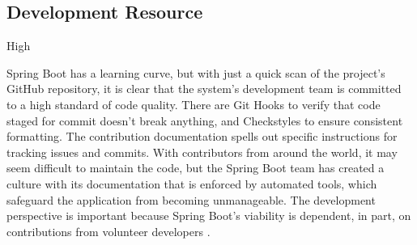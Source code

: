 \subsection*{Development Resource}

\ranking High

Spring Boot has a learning curve, but with just a quick scan of the project's GitHub repository, it is clear that the system's development team is committed to a high standard of code quality. There are Git Hooks to verify that code staged for commit doesn't break anything, and Checkstyles to ensure consistent formatting. The contribution documentation spells out specific instructions for tracking issues and commits. With contributors from around the world, it may seem difficult to maintain the code, but the Spring Boot team has created a culture with its documentation that is enforced by automated tools, which safeguard the application from becoming unmanageable. The development perspective is important because Spring Boot's viability is dependent, in part, on contributions from volunteer developers \cite{contributingDoc}.